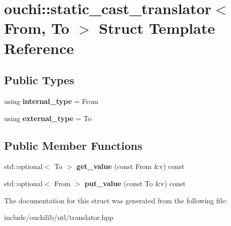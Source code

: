 \hypertarget{structouchi_1_1static__cast__translator}{}\section{ouchi\+::static\+\_\+cast\+\_\+translator$<$ From, To $>$ Struct Template Reference}
\label{structouchi_1_1static__cast__translator}
\subsection*{Public Types}
\begin{DoxyCompactItemize}
\item 
\mbox{\label{structouchi_1_1static__cast__translator_a45353013fd75917e57928380191a8a37}} 
using {\bfseries internal\+\_\+type} = From
\item 
\mbox{\label{structouchi_1_1static__cast__translator_a65abf6e335cf037233b0089e042a8c8d}} 
using {\bfseries external\+\_\+type} = To
\end{DoxyCompactItemize}
\subsection*{Public Member Functions}
\begin{DoxyCompactItemize}
\item 
\mbox{\label{structouchi_1_1static__cast__translator_a2dd61ca12e20e5371344eb676023eaf4}} 
std\+::optional$<$ To $>$ {\bfseries get\+\_\+value} (const From \&v) const
\item 
\mbox{\label{structouchi_1_1static__cast__translator_a82233ef84fc4712a73a64b0e45ce5688}} 
std\+::optional$<$ From $>$ {\bfseries put\+\_\+value} (const To \&v) const
\end{DoxyCompactItemize}


The documentation for this struct was generated from the following file\+:\begin{DoxyCompactItemize}
\item 
include/ouchilib/utl/translator.\+hpp\end{DoxyCompactItemize}
